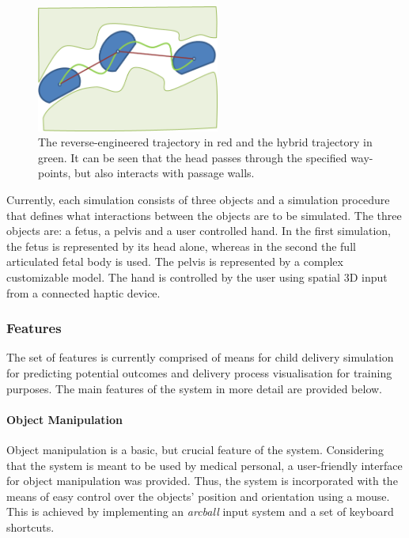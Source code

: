 \begin{figure}
  \centering
    \includegraphics[width=60mm]{sections/methodology/images/basic/hybrid-trajectory.png}
  \caption[The reverse-engineered trajectory in red and the hybrid trajectory in green.]{\label{hybridFig} The reverse-engineered trajectory in red and the hybrid trajectory in green. It can be seen that the head passes through the specified way-points, but also interacts with passage walls.}
\end{figure}

Currently, each simulation consists of three objects and a simulation procedure that defines what interactions between the objects are to be simulated. The three objects are: a fetus, a pelvis and a user controlled hand. In the first simulation, the fetus is represented by its head alone, whereas in the second the full articulated fetal body is used. The pelvis is represented by a complex customizable model. The hand is controlled by the user using spatial 3D input from a connected haptic device.

\subsubsection{Features}

The set of features is currently comprised of means for child delivery simulation for predicting potential outcomes and delivery process visualisation for training purposes. The main features of the system in more detail are provided below.

\paragraph{Object Manipulation}
Object manipulation is a basic, but crucial feature of the system. Considering that the system is meant to be used by medical personal, a user-friendly interface for object manipulation was provided. Thus, the system is incorporated with the means of easy control over the objects' position and orientation using a mouse. This is achieved by implementing an \emph{arcball} input system and a set of keyboard shortcuts.


